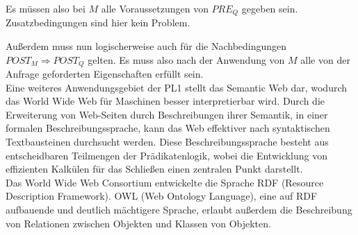 Es müssen also bei $M$ alle Voraussetzungen von $PRE_Q$ gegeben sein. Zusatzbedingungen sind hier kein Problem.

Außerdem muss nun logischerweise auch für die Nachbedingungen $POST_M \Rightarrow POST_Q$ gelten. Es muss also nach der Anwendung von $M$ alle von der Anfrage geforderten Eigenschaften erfüllt sein.\\

Eine weiteres Anwendungsgebiet der PL1 stellt das \glqq Semantic Web\grqq{} dar, wodurch das World Wide Web für Maschinen besser interpretierbar wird.
Durch die Erweiterung von Web-Seiten  durch Beschreibungen ihrer Semantik, in einer formalen Beschreibungssprache, kann das Web effektiver nach syntaktischen Textbausteinen durchsucht werden.
Diese Beschreibungssprache besteht aus entscheidbaren Teilmengen der Prädikatenlogik, wobei die Entwicklung von effizienten Kalkülen für das Schließen einen zentralen Punkt darstellt.\\
Das World Wide Web Consortium entwickelte die Sprache RDF (Resource Description Framework). 
OWL (Web Ontology Language), eine auf RDF aufbauende und deutlich mächtigere Sprache, erlaubt außerdem die Beschreibung von Relationen zwischen Objekten und Klassen von Objekten.